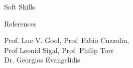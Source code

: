 \documentclass{resume} %
\begin{document}
\begin{paracol}{2}
\begin{rSection}{Soft Skills}{}
  \end{rSection}

\vspace{1.1mm}
\begin{rSection}{References}{} 
\begin{sSubsection}{Prof. Luc V. Gool, Prof. Fabio Cuzzolin, \\Prof Leonid Sigal, Prof. Philip Torr \\ Dr. Georgios Evangelidis}\end{sSubsection}
    

\end{rSection}
\end{paracol}
\end{document}
